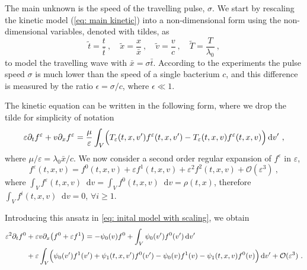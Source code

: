 \documentclass[11pt,twoside]{article}
\theoremstyle{nonumberplain}
\newcommand*\diff{\mathop{}\!\mathrm{d}}
\newcommand{\e}{\varepsilon}
\begin{document}
The main unknown is the speed of the travelling pulse, $\sigma$. We start by rescaling the kinetic model (\ref{eq: main kinetic}) into a non-dimensional form using the non-dimensional variables, denoted with tildes, as
\begin{equation}
    \tilde{t}= \frac{{t}}{\bar{t}}\ , \quad \tilde{x} = \frac{x}{\bar{x}}\ , \quad \tilde{v} = \frac{v}{c}\ , \quad \tilde{T}=\frac{T}{\lambda_0}\ ,
    \nonumber
\end{equation}
to model the travelling wave with $\bar{x} = \sigma\bar{t}$. According to the experiments the pulse
speed $\sigma$ is much lower than the speed of a single bacterium $c$, and this difference is measured by the ratio $\epsilon = \sigma / c$, where $\epsilon \ll 1$.



The kinetic equation can be written in the following form, where we  drop the tilde for simplicity of notation 
\begin{equation}
    \varepsilon \partial_t f^\varepsilon+{v}\partial_x f^\varepsilon = \frac{\mu}{\varepsilon}\int_V\Bigl(T_\varepsilon(t,x,v')f^\varepsilon(t,x,v')-T_\varepsilon(t,x,v)f^\varepsilon(t,x,v)\Bigr)\diff v'\ , \label{eq: inital model with scaling}
\end{equation}
where $\mu/\varepsilon=\lambda_0 \bar{x}/c$.
We now consider a second order regular expansion of $f^\e$ in $\varepsilon$, 
\begin{equation*}
f^\e(t,{x},{v})=f^0(t,{x},{v})+\varepsilon f^1(t,{x},{v})+\varepsilon^2 f^2(t,{x},{v})+\mathcal{O}(\varepsilon^3)\ , 
\end{equation*}
where $\int_V f^\e(t,{x},{v})\diff {v} = \int_V f^0(t,{x},{v})\diff {v} = \rho(t,{x})$, therefore $\int_V f^i(t,{x},{v})\diff {v}=0$, $\forall i\geq 1$.






Introducing this ansatz in \eqref{eq: inital model with scaling}, we obtain
\iffalse
{\begin{align*}
    \varepsilon^2\partial_t f^0&+\varepsilon{v}\partial_x\big(f^0+\varepsilon f^1  \big) 
    =-\psi_0(v) f^0+\int_V\psi_0(v')f^0(v')\diff v'\\
    &+\varepsilon\int_V\Bigl(\psi_0(v')f^1(v')+\psi_1(t,x,v')f^0(v')-\psi_0(v)f^1(v)-\psi_1(t,x,v)f^0(v) \Bigr)\diff v'+{\mathcal{O}(\varepsilon^3)}
      \ .
\end{align*}}
\end{document}
